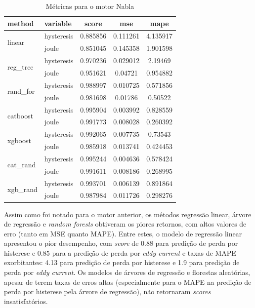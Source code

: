 \documentclass{article}
\begin{document}
\begin{table}[!htbp]
\centering
\caption{Métricas para o motor Nabla}
\begin{tabular}{llccc}
\toprule
\textbf{method} & \textbf{variable} & \textbf{score} & \textbf{mse} & \textbf{mape} \\
\midrule
\multirow{2}{*}{linear} 
    & hysteresis & 0.885856 & 0.111261 & 4.135917 \\
    & joule      & 0.851045 & 0.145358 & 1.901598 \\
\midrule
\multirow{2}{*}{reg\_tree} 
    & hysteresis & 0.970236 & 0.029012 & 2.19469 \\
    & joule      & 0.951621 & 0.04721 & 0.954882 \\
\midrule
\multirow{2}{*}{rand\_for} 
    & hysteresis & 0.988997 & 0.010725 & 0.571856 \\
    & joule      & 0.981698 & 0.01786 & 0.50522 \\
\midrule
\multirow{2}{*}{catboost} 
    & hysteresis & 0.995904 & 0.003992 & 0.828559 \\
    & joule      & 0.991773 & 0.008028 & 0.260392 \\
\midrule
\multirow{2}{*}{xgboost} 
    & hysteresis & 0.992065 & 0.007735 & 0.73543 \\
    & joule      & 0.985918 & 0.013741 & 0.424453 \\
\midrule
\multirow{2}{*}{cat\_rand} 
    & hysteresis & 0.995244 &	0.004636 &	0.578424\\
    & joule      & 0.991611 &	0.008186 &	0.268995\\
\midrule
\multirow{2}{*}{xgb\_rand} 
    & hysteresis & 0.993701 &	0.006139 &	0.891864\\
    & joule      &  0.987984 &	0.011726 &	0.298276\\
\bottomrule
\end{tabular}
\end{table}

Assim como foi notado para o motor anterior, os métodos regressão linear, árvore de regressão e \textit{random forests} obtiveram os piores retornos, com altos valores de erro (tanto em MSE quanto MAPE). Entre estes, o modelo de regressão linear apresentou o pior desempenho, com \textit{score} de 0.88 para predição de perda por histerese e 0.85 para a predição de perda por \textit{eddy current} e taxas de MAPE exorbitantes: 4.13 para predição de perda por histerese e 1.9 para predição de perda por \textit{eddy current}. Os modelos de árvores de regressão e florestas aleatórias, apesar de terem taxas de erros altas (especialmente para o MAPE na predição de perda por histerese pela árvore de regressão), não retornaram \textit{scores} insatisfatórios. 
\end{document}
